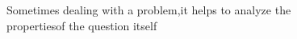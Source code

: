\documentclass[preview]{standalone}
\begin{document}
\begin{center}
Sometimes dealing with a problem,it helps to analyze the\\propertiesof the question itself
\end{center}
\end{document}
